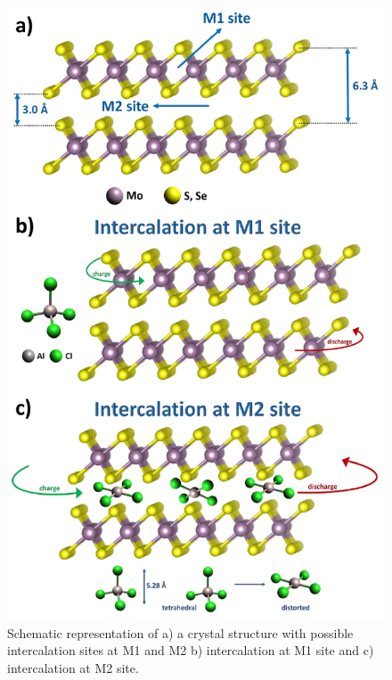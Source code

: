 \begin{figure}
  \centering
  \includegraphics[width=\textwidth]{Figures/chap4fig/s1}
  \caption{Schematic representation of a) a  crystal structure with possible intercalation sites at M1 and M2 b) intercalation at M1 site and c) intercalation at M2 site.}
  \label{Figures/chap4fig:s1}
\end{figure}

